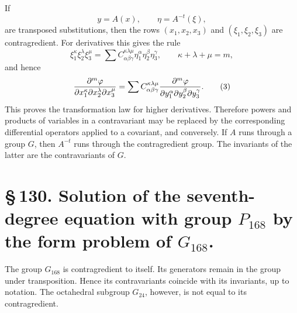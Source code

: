 \documentclass[11pt]{article}
\begin{document}
If
\begin{equation}
y=A(x),\qquad \eta=A^{-t}(\xi),
\tag{1}
\end{equation}
are transposed substitutions, then the rows \((x_1,x_2,x_3)\) and \((\xi_1,\xi_2,\xi_3)\) are contragredient. For derivatives this gives the rule
\begin{equation}
\xi_1^\kappa\xi_2^\lambda\xi_3^\mu
=\sum C^{\kappa\lambda\mu}_{\alpha\beta\gamma}
\eta_1^\alpha\eta_2^\beta\eta_3^\gamma,
\qquad \kappa+\lambda+\mu=m,
\tag{2}
\end{equation}
and hence
\begin{equation}
{\partial^m \varphi\over\partial x_1^\kappa\partial x_2^\lambda\partial x_3^\mu}
=\sum C^{\kappa\lambda\mu}_{\alpha\beta\gamma}
{\partial^m \varphi\over\partial y_1^\alpha\partial y_2^\beta\partial y_3^\gamma}.
\tag{3}
\end{equation}
This proves the transformation law for higher derivatives. Therefore powers and products of variables in a contravariant may be replaced by the corresponding differential operators applied to a covariant, and conversely. If \(A\) runs through a group \(G\), then \(A^{-t}\) runs through the contragredient group. The invariants of the latter are the contravariants of \(G\).

\section*{\S\,130. Solution of the seventh-degree equation with group \(P_{168}\) by the form problem of \(G_{168}\).}

The group \(G_{168}\) is contragredient to itself. Its generators remain in the group under transposition. Hence its contravariants coincide with its invariants, up to notation. The octahedral subgroup \(G_{24}\), however, is not equal to its contragredient.
\end{document}
